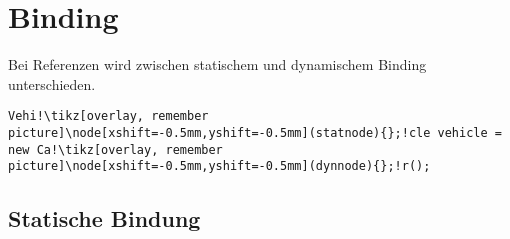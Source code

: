 \section{Binding}
Bei Referenzen wird zwischen statischem und dynamischem Binding unterschieden.
\vspace{-0.7\abovedisplayskip}
\begin{lstlisting}[numbers=none, 
    escapechar=!, 
    xleftmargin=-3mm, 
    linewidth=0.39\columnwidth,
    framexleftmargin=-3mm]
    Vehi!\tikz[overlay, remember picture]\node[xshift=-0.5mm,yshift=-0.5mm](statnode){};!cle vehicle = new Ca!\tikz[overlay, remember picture]\node[xshift=-0.5mm,yshift=-0.5mm](dynnode){};!r();
\end{lstlisting}

\subsection{Statische Bindung}
\vspace{-0.8\abovedisplayskip}
\begin{minipage}[t]{0.59\columnwidth}
    
\end{minipage}\hfill%
\begin{minipage}[t]{0.4\columnwidth}
    
\end{minipage}

